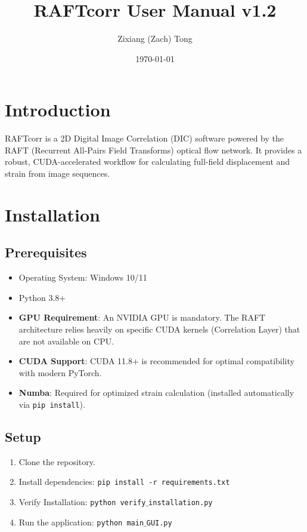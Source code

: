 \documentclass[a4paper,12pt]{article}
\title{\textbf{RAFTcorr User Manual v1.2}}
\author{Zixiang (Zach) Tong}
\date{\today}
\begin{document}
\maketitle
\tableofcontents
\newpage

\section{Introduction}
RAFTcorr is a 2D Digital Image Correlation (DIC) software powered by the RAFT (Recurrent All-Pairs Field Transforms) optical flow network. It provides a robust, CUDA-accelerated workflow for calculating full-field displacement and strain from image sequences.

\section{Installation}
\subsection{Prerequisites}
\begin{itemize}
    \item Operating System: Windows 10/11
    \item Python 3.8+
    \item \textbf{GPU Requirement}: An NVIDIA GPU is mandatory. The RAFT architecture relies heavily on specific CUDA kernels (Correlation Layer) that are not available on CPU.
    \item \textbf{CUDA Support}: CUDA 11.8+ is recommended for optimal compatibility with modern PyTorch.
    \item \textbf{Numba}: Required for optimized strain calculation (installed automatically via \texttt{pip install}).
\end{itemize}

\subsection{Setup}
\begin{enumerate}
    \item Clone the repository.
    \item Install dependencies: \texttt{pip install -r requirements.txt}
    \item Verify Installation: \texttt{python verify$\_$installation.py}
    \item Run the application: \texttt{python main$\_$GUI.py}
\end{enumerate}
\end{document}

